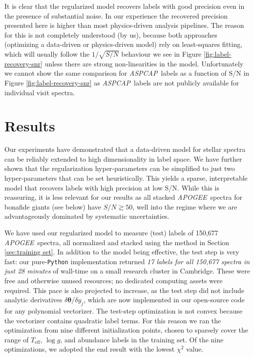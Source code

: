 \documentclass[12pt,preprint]{aastex6}
\newcommand{\project}[1]{\textsl{#1}}
\newcommand{\acronym}[1]{{\small{#1}}}
\newcommand{\apogee}{\project{\acronym{APOGEE}}}
\newcommand{\aspcap}{\project{\acronym{ASPCAP}}}
\newcommand{\logg}{\log g}
\newcommand{\Teff}{T_{\mathrm{eff}}}
\newcommand{\Dvector}[1]{\boldsymbol{#1}}
\newcommand{\vectheta}{\Dvector{\theta}}
\begin{document}
It is clear that the regularized model recovers labels with good precision even
in the presence of substantial noise.  In our experience the recovered 
precision presented here is higher than most physics-driven analysis pipelines.  
The reason for this is not completely understood (by us), because both approaches 
(optimizing a data-driven or physics-driven model) rely on least-squares 
fitting, which will usually follow the $1/\sqrt{S/N}$ behaviour we see in Figure 
\ref{fig:label-recovery-snr} unless there are strong non-linearities in the model.
Unfortunately we cannot show the same comparison for \aspcap\ labels as a 
function of S/N in Figure \ref{fig:label-recovery-snr} as \aspcap\ labels are not
publicly available for individual visit spectra.




\section{Results}
\label{sec:results}


Our experiments have demonstrated that a data-driven model for stellar spectra
can be reliably extended to high dimensionality in label space.  We have further
shown that the regularization hyper-parameters can be simplified to just two
hyper-parameters that can be set heuristically.  This yields a sparse, interpretable 
model that recovers labels with high precision at low S/N.  While this is 
reassuring, it is less relevant for our results as all stacked \apogee\
spectra for bonafide giants (see below) have $S/N \gtrsim 50$, well into the 
regime where we are advantageously dominated by systematic uncertainties.


We have used our regularized model to measure (test) labels of 150,677 \apogee\ 
spectra, all normalized and stacked using the method in Section 
\ref{sec:training set}.  In addition to the model being effective,
the test step is very fast: our pure-\texttt{Python} implementation returned 
\emph{17 labels for all 150,677 spectra in just 28 minutes} of wall-time 
on a small research cluster in Cambridge.  These were free 
and otherwise unused resources; no dedicated computing assets were required.  
This pace is also projected to increase, as the test step did not include 
analytic derivatives $\delta\vectheta/\delta{}y_j$, which are now implemented
in our open-source code for any polynomial vectorizer.  The test-step 
optimization is not convex because the vectorizer contains
quadratic label terms.  For this reason we ran the optimization from nine
different initialization points, chosen to sparsely cover the range of
$\Teff$, $\logg$, and abundance labels in the training set.  Of the nine
optimizations, we adopted the end result with the lowest $\chi^2$ value.
\end{document}
